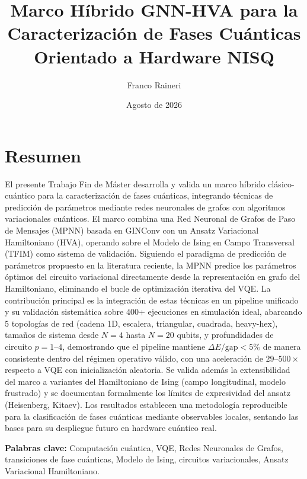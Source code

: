 \documentclass[11pt,a4paper,spanish]{book}
\title{Marco Híbrido GNN-HVA para la Caracterización de Fases Cuánticas Orientado a Hardware NISQ}
\author{Franco Raineri}
\date{Agosto de 2026}
\begin{document}
\renewcommand{\listfigurename}{Índice de figuras}
\renewcommand{\listtablename}{Índice de tablas}
\renewcommand{\contentsname}{Índice de contenidos}
\renewcommand{\figurename}{Figura}
\renewcommand{\tablename}{Tabla}

\maketitle
\frontmatter
\tableofcontents
\listoffigures
\listoftables

\chapter{Resumen}

El presente Trabajo Fin de Máster desarrolla y valida un marco híbrido clásico-cuántico para la caracterización de fases cuánticas, integrando técnicas de predicción de parámetros mediante redes neuronales de grafos con algoritmos variacionales cuánticos. El marco combina una Red Neuronal de Grafos de Paso de Mensajes (MPNN) basada en GINConv con un Ansatz Variacional Hamiltoniano (HVA), operando sobre el Modelo de Ising en Campo Transversal (TFIM) como sistema de validación. Siguiendo el paradigma de predicción de parámetros propuesto en la literatura reciente, la MPNN predice los parámetros óptimos del circuito variacional directamente desde la representación en grafo del Hamiltoniano, eliminando el bucle de optimización iterativa del VQE. La contribución principal es la integración de estas técnicas en un pipeline unificado y su validación sistemática sobre 400+ ejecuciones en simulación ideal, abarcando 5 topologías de red (cadena 1D, escalera, triangular, cuadrada, heavy-hex), tamaños de sistema desde $N=4$ hasta $N=20$ qubits, y profundidades de circuito $p = 1$--$4$, demostrando que el pipeline mantiene $\Delta E/\text{gap} < 5\%$ de manera consistente dentro del régimen operativo válido, con una aceleración de $29$--$500\times$ respecto a VQE con inicialización aleatoria. Se valida además la extensibilidad del marco a variantes del Hamiltoniano de Ising (campo longitudinal, modelo frustrado) y se documentan formalmente los límites de expresividad del ansatz (Heisenberg, Kitaev). Los resultados establecen una metodología reproducible para la clasificación de fases cuánticas mediante observables locales, sentando las bases para su despliegue futuro en hardware cuántico real.

\vspace{0.5cm}
{\bf Palabras clave:} Computación cuántica, VQE, Redes Neuronales de Grafos, transiciones de fase cuánticas, Modelo de Ising, circuitos variacionales, Ansatz Variacional Hamiltoniano.
\end{document}
